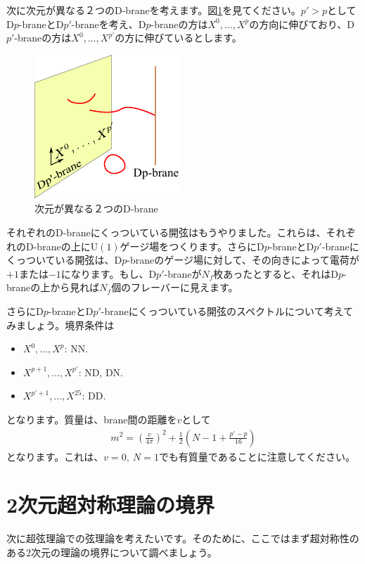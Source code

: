 \documentclass[report,paper=a4, fontsize=12pt, line_length=16cm, number_of_lines=34,dvipdfmx]{jlreq}
\numberwithin{equation}{chapter}
\numberwithin{equation}{section}
\begin{document}
次に次元が異なる２つのD-braneを考えます。図\ref{fig:ppprimebrane}を見てください。$p'>p$としてD$p$-braneとD$p'$-braneを考え、D$p$-braneの方は$X^{0},\dots,X^{p}$の方向に伸びており、D$p'$-braneの方は$X^{0},\dots,X^{p'}$の方に伸びているとします。

\begin{figure}
  \centering
  \includegraphics[scale=1.5]{ppprimebrane.pdf}
  \caption{次元が異なる２つのD-brane}
  \label{fig:ppprimebrane}
\end{figure}

それぞれのD-braneにくっついている開弦はもうやりました。これらは、それぞれのD-braneの上にU$(1)$ゲージ場をつくります。さらにD$p$-braneとD$p'$-braneにくっついている開弦は、D$p$-braneのゲージ場に対して、その向きによって電荷が$+1$または$-1$になります。もし、D$p'$-braneが$N_f$枚あったとすると、それはD$p$-braneの上から見れば$N_f$個のフレーバーに見えます。

さらにD$p$-braneとD$p'$-braneにくっついている開弦のスペクトルについて考えてみましょう。境界条件は
\begin{itemize}
  \item $X^{0},\dots,X^{p}$: NN.
  \item $X^{p+1},\dots,X^{p'}$: ND, DN.
  \item $X^{p'+1},\dots,X^{25}$: DD.
\end{itemize}
となります。質量は、brane間の距離を$v$として
\begin{align}
  m^{2}=\left( \frac{v}{4\pi} \right)^2+\frac12\left( N-1+\frac{p'-p}{16} \right)
\end{align}
となります。これは、$v=0,\ N=1$でも有質量であることに注意してください。

\section{2次元超対称理論の境界}
次に超弦理論での弦理論を考えたいです。そのために、ここではまず超対称性のある2次元の理論の境界について調べましょう。
\end{document}
